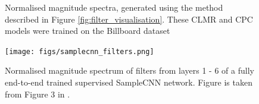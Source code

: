 \begin{figure}
    \hfill
    \hfill
    \caption{Normalised magnitude spectra, generated using the method described in Figure \ref{fig:filter_visualisation}. These CLMR and CPC models were trained on the Billboard dataset}
    \label{fig:filter_visualisation_billboard}
\end{figure}

\begin{figure}
    \centering
    \texttt{[image: figs/samplecnn\_filters.png]}
    \caption{Normalised magnitude spectrum of filters from layers 1 - 6 of a fully end-to-end trained supervised SampleCNN network. Figure is taken from Figure 3 in \cite{lee2018samplecnn}.}
    \label{fig:samplecnn_filters}
\end{figure}


